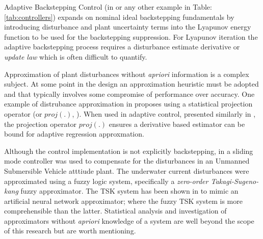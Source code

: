 \par
Adaptive Backstepping Control (in \cite{backstepping} or any other example in Table:\ref{tab:controllers}) expands on nominal ideal backstepping fundamentals by introducing disturbance and plant uncertainty terms into the Lyapunov energy function to be used for the backstepping suppression. For Lyapunov iteration the adaptive backstepping process requires a disturbance estimate derivative or \emph{update law} which is often difficult to quantify.
\par
Approximation of plant disturbances without \emph{apriori} information is a complex subject. At some point in the design an approximation heuristic must be adopted and that typically involves some compromise of performance over accuracy. One example of distrubance approximation in \cite{nonlinearadaptive} proposes using a statistical projection operator (or $proj(.)$, \cite{adaptiveregulation}). When used in adaptive control, presented similarly in \cite{outputfeedback}, the projection operator $proj(.)$ ensures a derivative based estimator can be bound for adaptive regression approxmation\cite{nonlinearregression}.
\par
Although the control implementation is not explicitly backstepping, in \cite{adaptiveslidingmode} a sliding mode controller was used to compensate for the disturbances in an Unmanned Submersible Vehicle atttiude plant. The underwater current disturbances were approximated using a fuzzy logic system, specifically a \emph{zero-order Takagi-Sugeno-kang} fuzzy approximator. The TSK system has been shown in \cite{zeroTSK} to mimic an artificial neural network approximator; where the fuzzy TSK system is more comprehensible than the latter. Statistical analysis and investigation of approximators without \emph{apriori} knowledge of a system are well beyond the scope of this research but are worth mentioning.
